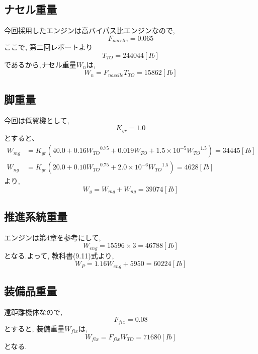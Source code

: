 \documentclass[class=article, crop=false, dvipdfmx, fleqn]{standalone}
\begin{document}
\subsection{ナセル重量}
今回採用したエンジンは高バイパス比エンジンなので,
\begin{equation}
  F_{nacelle} = 0.065
\end{equation}
ここで, 第二回レポートより
\begin{equation}
  T_{TO} = 244044 [Ib]
\end{equation}
であるから,ナセル重量$W_n$は,
\begin{equation}
  W_n = F_{nacelle}T_{TO} = 15862 [Ib]
\end{equation}

\subsection{脚重量}
今回は低翼機として,
\begin{equation}
  K_{gr} = 1.0
\end{equation}
とすると、
\begin{align}
  W_{mg} &= K_{gr}(40.0 + 0.16 {W_{TO}}^{0.75} + 0.019W_{TO} + 1.5 \times 10^{-5}{W_{TO}}^{1.5})
  = 34445 [Ib]\\
  W_{ng} &= K_{gr}(20.0 + 0.10 {W_{TO}}^{0.75} + 2.0 \times 10^{-6}{W_{TO}}^{1.5})
  = 4628 [Ib]
\end{align}
より,
\begin{equation}
  W_g = W_{mg} + W_{ng} = 39074 [Ib]
\end{equation}

\subsection{推進系統重量}
エンジンは第4章を参考にして,
\begin{equation}
  W_{eng} = 15596 \times 3 = 46788 [Ib]
\end{equation}
となる.よって, 教科書(9.11)式より,
\begin{equation}
  W_P = 1.16W_{eng} + 5950 = 60224 [Ib]
\end{equation}

\subsection{装備品重量}
遠距離機体なので,
\begin{equation}
  F_{fix} = 0.08
\end{equation}
とすると, 装備重量$W_{fix}$は,
\begin{equation}
  W_{fix} = F_{fix}W_{TO} = 71680 [Ib]
\end{equation}
となる.
\end{document}
